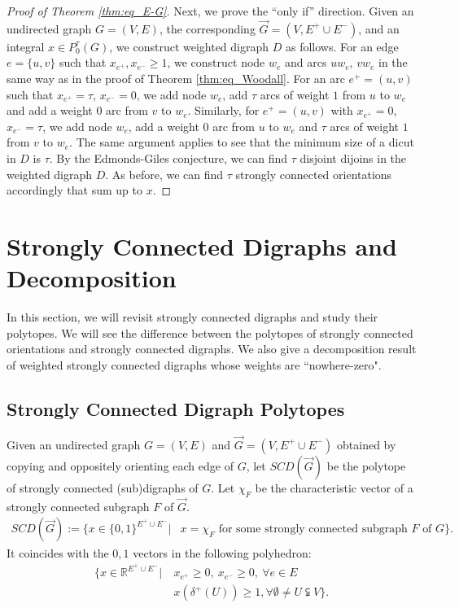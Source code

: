 \documentclass[runningheads]{llncs}
\begin{document}
\begin{proof}[Proof of Theorem \ref{thm:eq_E-G}]
    Next, we prove the ``only if'' direction. Given an undirected graph $G=(V,E)$, the corresponding $\vec{G}=(V,E^+\cup E^-)$, and an integral $x\in P_0^\tau(G)$, we construct weighted digraph $D$ as follows. For an edge $e=\{u,v\}$ such that $x_{e^+}, x_{e^-}\geq 1$, we construct node $w_e$ and arcs $uw_e$, $vw_e$ in the same way as in the proof of Theorem \ref{thm:eq_Woodall}. For an arc $e^+=(u,v)$ such that $x_{e^+}=\tau$, $x_{e^-}=0$, we add node $w_e$, add $\tau$ arcs of weight $1$ from $u$ to $w_e$ and add a weight $0$ arc from $v$ to $w_e$. Similarly, for $e^+=(u,v)$ with $x_{e^+}=0$, $x_{e^-}=\tau$, we add node $w_e$, add a weight $0$ arc from $u$ to $w_e$ and $\tau$ arcs of weight $1$ from $v$ to $w_e$. The same argument applies to see that the minimum size of a dicut in $D$ is $\tau$. By the Edmonds-Giles conjecture, we can find $\tau$ disjoint dijoins in the weighted digraph $D$. As before, we can find $\tau$ strongly connected orientations accordingly that sum up to $x$.
\end{proof}











\section{Strongly Connected Digraphs and Decomposition}\label{sec:Decompose_SCD}
In this section, we will revisit strongly connected digraphs and study their polytopes. We will see the difference between the polytopes of strongly connected orientations and strongly connected digraphs. We also give a decomposition result of weighted strongly connected digraphs whose weights are ``nowhere-zero". 
\subsection{Strongly Connected Digraph Polytopes}
Given an undirected graph $G=(V,E)$ and $\vec{G}=(V,E^+\cup E^-)$ obtained by copying and oppositely orienting each edge of $G$, let $SCD(\vec{G})$ be the polytope of strongly connected (sub)digraphs of $G$. Let $\chi_F$ be the characteristic vector of a strongly connected subgraph $F$ of $\vec{G}$.
     \begin{equation}
    \begin{aligned}
        SCD(\vec{G}):=\big\{x\in\{0,1\}^{E^+\cup E^-}\big|&x=\chi_F \text{ for some }  \text{strongly connected subgraph $F$ of $G$}\big\}.
    \end{aligned}
    \end{equation}
It coincides with the $0,1$ vectors in the following polyhedron:
\[
\begin{aligned}
    \big\{x\in\mathbb{R}^{E^+\cup E^-}\big|~&x_{e^+}\geq 0,~ x_{e^-}\geq 0, ~\forall e\in E\\
        &x(\delta^+(U))\geq 1, \forall \emptyset \neq U\subsetneqq V\big\}.
\end{aligned}
\]
\end{document}
